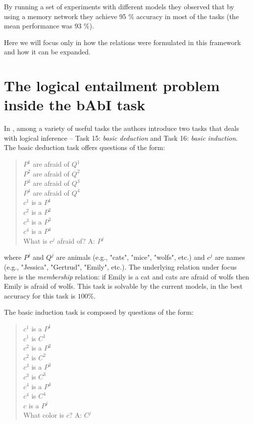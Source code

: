 By running a set of experiments with different models they observed that by using a memory network they achieve 95 $\%$ accuracy in most of the tasks (the mean performance was 93 $\%$).

Here we will focus only in how the relations were formulated in this framework and how it can be expanded.

\section{The logical entailment problem inside the bAbI task}
\label{ch:03-tasks}


In \cite{WestonBCM15}, among a variety of useful tasks the authors introduce two tasks that deals with logical inference -- Task 15: \textit{basic deduction} and Task 16: \textit{basic induction}. The basic deduction task offers questions of the form:

\begin{quote} 
\centering 
$P^{1}$ are afraid of $Q^{1}$\\
$P^{2}$ are afraid of $Q^{2}$\\
$P^{3}$ are afraid of $Q^{3}$\\
$P^{4}$ are afraid of $Q^{4}$\\
$c^{1}$ is a $P^{1}$\\
$c^{2}$ is a $P^{2}$\\
$c^{3}$ is a $P^{3}$\\
$c^{4}$ is a $P^{4}$\\
What is $c^j$ afraid of? A: $P^{j}$\\
\end{quote}

where $P^j$ and $Q^j$ are animals (e.g., "cats", "mice", "wolfs", etc.) and $c^j$ are names (e.g., "Jessica", "Gertrud", "Emily", etc.). The underlying relation under focus here is the \textit{membership} relation: if Emily is a cat and cats are afraid of wolfs then Emily is afraid of wolfs. This task is solvable by the current models, in \cite{WestonBCM15} the best accuracy for this task is $100\%$. 

The basic induction task is composed by questions of the form:

\begin{quote} 
\centering 
$c^{1}$ is a $P^{1}$\\
$c^{1}$ is $C^{1}$\\
$c^{2}$ is a $P^{2}$\\
$c^{2}$ is $C^{2}$\\
$c^{3}$ is a $P^{3}$\\
$c^{3}$ is $C^{3}$\\
$c^{4}$ is a $P^{4}$\\
$c^{4}$ is $C^{4}$\\
$c$ is a $P^{j}$\\
What color is $c$? A: $C^{j}$\\
\end{quote}

